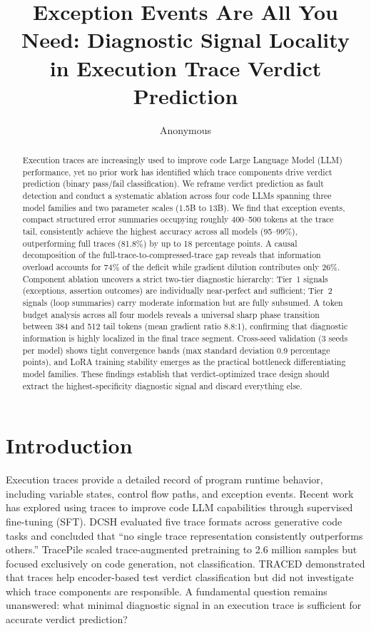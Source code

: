 \documentclass[11pt,a4paper]{article}
\title{Exception Events Are All You Need: Diagnostic Signal Locality \\in Execution Trace Verdict Prediction}
\author{Anonymous}
\begin{document}
\maketitle

\begin{abstract}
Execution traces are increasingly used to improve code Large Language Model (LLM) performance, yet no prior work has identified which trace components drive verdict prediction (binary pass/fail classification). We reframe verdict prediction as fault detection and conduct a systematic ablation across four code LLMs spanning three model families and two parameter scales (1.5B to 13B). We find that exception events, compact structured error summaries occupying roughly 400--500 tokens at the trace tail, consistently achieve the highest accuracy across all models (95--99\%), outperforming full traces (81.8\%) by up to 18 percentage points. A causal decomposition of the full-trace-to-compressed-trace gap reveals that information overload accounts for 74\% of the deficit while gradient dilution contributes only 26\%. Component ablation uncovers a strict two-tier diagnostic hierarchy: Tier~1 signals (exceptions, assertion outcomes) are individually near-perfect and sufficient; Tier~2 signals (loop summaries) carry moderate information but are fully subsumed. A token budget analysis across all four models reveals a universal sharp phase transition between 384 and 512 tail tokens (mean gradient ratio 8.8:1), confirming that diagnostic information is highly localized in the final trace segment. Cross-seed validation (3 seeds per model) shows tight convergence bands (max standard deviation 0.9 percentage points), and LoRA training stability emerges as the practical bottleneck differentiating model families. These findings establish that verdict-optimized trace design should extract the highest-specificity diagnostic signal and discard everything else.
\end{abstract}

\section{Introduction}

Execution traces provide a detailed record of program runtime behavior, including variable states, control flow paths, and exception events. Recent work has explored using traces to improve code LLM capabilities through supervised fine-tuning (SFT). DCSH \cite{ni2024dcsh} evaluated five trace formats across generative code tasks and concluded that ``no single trace representation consistently outperforms others.'' TracePile \cite{tracepile2025} scaled trace-augmented pretraining to 2.6 million samples but focused exclusively on code generation, not classification. TRACED \cite{traced2024} demonstrated that traces help encoder-based test verdict classification but did not investigate which trace components are responsible. A fundamental question remains unanswered: what minimal diagnostic signal in an execution trace is sufficient for accurate verdict prediction?
\end{document}
